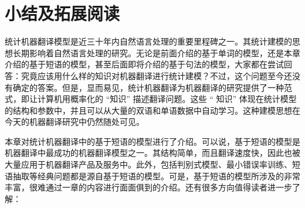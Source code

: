 \sectionnewpage
\section{小结及拓展阅读}\label{section-7.8}

\parinterval 统计机器翻译模型是近三十年内自然语言处理的重要里程碑之一。其统计建模的思想长期影响着自然语言处理的研究。无论是前面介绍的基于单词的模型，还是本章介绍的基于短语的模型，甚至后面即将介绍的基于句法的模型，大家都在尝试回答：究竟应该用什么样的知识对机器翻译进行统计建模？不过，这个问题至今还没有确定的答案。但是，显而易见，统计机器翻译为机器翻译的研究提供了一种范式，即让计算机用概率化的 “知识” 描述翻译问题。这些 “ 知识” 体现在统计模型的结构和参数中，并且可以从大量的双语和单语数据中自动学习。这种建模思想在今天的机器翻译研究中仍然随处可见。

\parinterval 本章对统计机器翻译中的基于短语的模型进行了介绍。可以说，基于短语的模型是机器翻译中最成功的机器翻译模型之一。其结构简单，而且翻译速度快，因此也被大量应用于机器翻译产品及服务中。此外，包括判别式模型、最小错误率训练、短语抽取等经典问题都是源自基于短语的模型。可是，基于短语的模型所涉及的非常丰富，很难通过一章的内容进行面面俱到的介绍。还有很多方向值得读者进一步了解：

